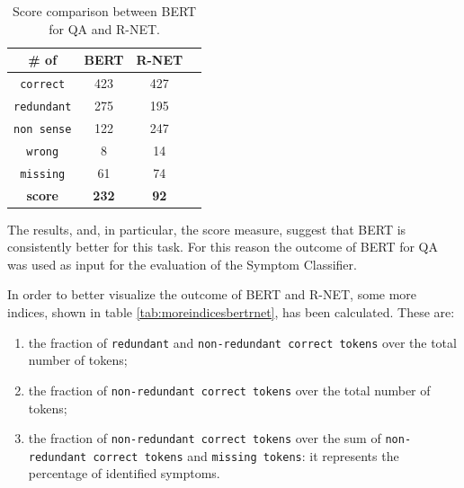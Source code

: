 \begin{center}
  \begin{table}[h]
  \centering
     \begin{tabular}{| c | c | c | c |} 
     \hline
     \# of & BERT & R-NET \\ [0.5ex] 
     \hline\hline
     \rowcolor{green}
     \texttt{correct} & 423 & 427 \\ 
     \hline
     \rowcolor{lightgreen}
     \texttt{redundant} & 275 & 195 \\
     \hline
     \rowcolor{red}
     \texttt{non sense} & 122 & 247 \\
     \hline
     \rowcolor{red}
     \texttt{wrong} & 8 & 14 \\
     \hline
     \rowcolor{red}
     \texttt{missing} & 61 & 74 \\
     \hline
     \textbf{score} & \textbf{232} & \textbf{92} \\ 
     \hline
    \end{tabular}
 \caption{\label{tab:bertrnet} Score comparison between BERT for QA and R-NET.}
 \end{table}
\end{center}

The results, and, in particular, the score measure, suggest that BERT is consistently better for this task. For this reason the outcome of BERT for QA was used as input for the evaluation of the Symptom Classifier.

In order to better visualize the outcome of BERT and R-NET, some more indices, shown in table \ref{tab:moreindicesbertrnet}, has been calculated. 
\newpage
These are:
\begin{enumerate}
  \item the fraction of \texttt{redundant} and \texttt{non-redundant correct tokens} over the total number of tokens;
  \item the fraction of \texttt{non-redundant correct tokens} over the total number of tokens;
  \item the fraction of \texttt{non-redundant correct tokens} over the sum of \texttt{non-redundant correct tokens} and \texttt{missing tokens}: it represents the percentage of identified symptoms.
\end{enumerate}

